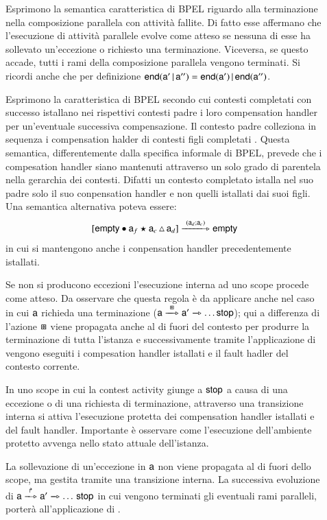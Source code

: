 \begin{description}
  
  \item[ ] Esprimono la semantica
  caratteristica di BPEL riguardo alla terminazione nella composizione
  parallela con attività fallite. Di fatto esse affermano che l'esecuzione di
  attività parallele evolve come atteso se nessuna di esse ha sollevato
  un'eccezione o richiesto una terminazione. Viceversa, se questo accade, tutti
  i rami della composizione parallela vengono terminati. Si ricordi anche che 
  per definizione ${\sf end}( {\sf a}' \,|\, {\sf a}'' ) =  {\sf end}({\sf a}') \,|\,
  {\sf end}({\sf a}'')$.
  
  \item[ ] Esprimono la caratteristica
  di BPEL secondo cui contesti completati con successo istallano nei rispettivi
  contesti padre i loro compensation handler per un'eventuale successiva
  compensazione. Il contesto padre colleziona in sequenza i compensation halder
  di contesti figli completati . Questa
  semantica, differentemente dalla specifica informale di BPEL, prevede che i
  compesation handler siano mantenuti attraverso un solo grado di parentela
  nella gerarchia dei contesti. Difatti un contesto completato istalla nel suo
  padre solo il suo conpensation handler e non quelli istallati dai suoi figli.
  Una semantica alternativa poteva essere:
  $$
  \xinstnostate{\xsigma}{\xscope{\xskip}{\xs_f}{\xs_c}{\xs_d}}
\bpeltsarrow{\xdonel{\xs_d;\xs_c}}
\xinstnostate{\xsigma}{\xskip} 
  $$
  in cui si mantengono anche i conpensation handler precedentemente istallati.

  \item[] Se non si producono eccezioni l'esecuzione
  interna ad uno scope procede come atteso. Da osservare che questa regola è da
  applicare anche nel caso in cui ${\sf a}$ richieda una terminazione 
  (${\xs} \bpeltsarrow{\xexitl} \xs' \bpeltsarrow{} \ldots {\xstop}$); qui a
  differenza di  l'azione $\boxast$ viene propagata
  anche al di fuori del contesto per produrre la terminazione di tutta
  l'istanza e successivamente tramite l'applicazione di  vengono eseguiti i
  compesation handler istallati e il fault hadler del contesto corrente.
  
  \item[] In uno scope in cui la contest activity giunge a 
  ${\sf stop}$ a causa di una eccezione o di una richiesta di terminazione,
  attraverso una transizione interna si attiva l'esecuzione protetta dei
  compensation handler istallati e del fault handler. Importante è osservare
  come l'esecuzione dell'ambiente protetto avvenga nello stato attuale
  dell'istanza.
  
  \item[] La sollevazione di un'eccezione in ${\sf a}$ non
  viene propagata al di fuori dello scope, ma gestita tramite una transizione
  interna.  La successiva evoluzione di ${\xs} \bpeltsarrow{\xthrl} \xs'
  \bpeltsarrow{} \ldots \, {\xstop}$ in cui vengono terminati gli eventuali
  rami paralleli, porterà all'applicazione di . 
\end{description}

